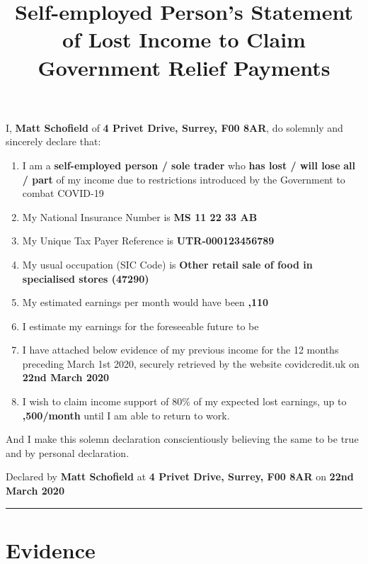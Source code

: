 \documentclass[12pt]{article}
\title{Self-employed Person's Statement of Lost Income to Claim Government Relief Payments}
\begin{document}
\selectfont

\maketitle

I, \textbf{Matt Schofield} of \textbf{4 Privet Drive, Surrey, F00 8AR}, do solemnly and sincerely declare that: 

\vspace{12pt}

\begin{enumerate}
  \item I am a \textbf{self-employed person / sole trader} who \textbf{has lost / will lose} \textbf{all / part} of my income due to restrictions introduced by the Government to combat COVID-19
  \item My National Insurance Number is \textbf{MS 11 22 33 AB}
  \item My Unique Tax Payer Reference is \textbf{UTR-000123456789}
  \item My usual occupation (SIC Code) is \textbf{Other retail sale of food in specialised stores (47290)}
  \item My estimated earnings per month would have been \textbf{,110}
  \item I estimate my earnings for the foreseeable future to be \textbf{}
  \item I have attached below evidence of my previous income for the 12 months preceding March 1st 2020, securely retrieved by the website covidcredit.uk on \textbf{22nd March 2020}
  \item I wish to claim income support of 80\% of my expected lost earnings, up to \textbf{,500/month} until I am able to return to work.
\end{enumerate}

\vspace{12pt}

And I make this solemn declaration conscientiously believing the same to be true and by personal declaration.

\vspace{36pt}

Declared by \textbf{Matt Schofield} at \textbf{4 Privet Drive, Surrey, F00 8AR} on \textbf{22nd March 2020}

\vspace{18pt}

\rule{\textwidth}{0.4pt}

\pagebreak

\section{Evidence}
\end{document}

